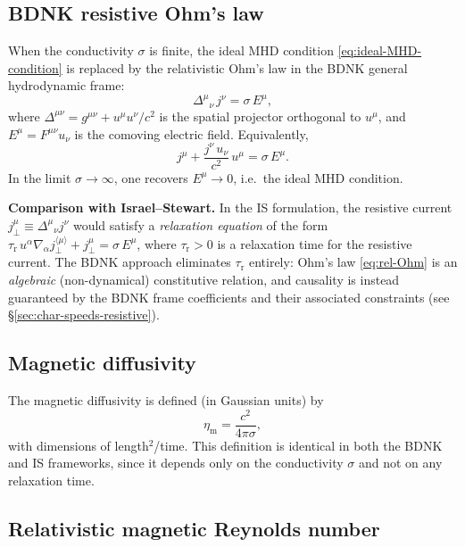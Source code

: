 \subsection{BDNK resistive Ohm's law}

When the conductivity $\sigma$ is finite, the ideal MHD condition
\eqref{eq:ideal-MHD-condition} is replaced by the relativistic Ohm's law
in the BDNK general hydrodynamic frame:
\begin{equation}
  \Delta^{\mu}{}_{\nu}\,j^{\nu} = \sigma\,E^{\mu},
  \label{eq:rel-Ohm-proj}
\end{equation}
where $\Delta^{\mu\nu} = g^{\mu\nu}+u^{\mu}u^{\nu}/c^{2}$ is the
spatial projector orthogonal to $u^{\mu}$, and $E^{\mu}=F^{\mu\nu}u_{\nu}$
is the comoving electric field.  Equivalently,
\begin{equation}
  j^{\mu} + \frac{j^{\nu}\,u_{\nu}}{c^{2}}\,u^{\mu}
  = \sigma\,E^{\mu}.
  \label{eq:rel-Ohm}
\end{equation}
In the limit $\sigma\to\infty$, one recovers $E^{\mu}\to 0$,
i.e.\ the ideal MHD condition.

\medskip\noindent
\textbf{Comparison with Israel--Stewart.}\quad
In the IS formulation, the resistive current $j^{\mu}_{\perp}
\equiv \Delta^{\mu}{}_{\nu}j^{\nu}$ would satisfy a \emph{relaxation
equation} of the form
$\tau_{\mathrm{r}}\,u^{\alpha}\nabla_{\alpha}j^{\langle\mu\rangle}_{\perp}
+ j^{\mu}_{\perp} = \sigma\,E^{\mu}$,
where $\tau_{\mathrm{r}}>0$ is a relaxation time for the resistive
current.  The BDNK approach eliminates $\tau_{\mathrm{r}}$ entirely:
Ohm's law \eqref{eq:rel-Ohm} is an \emph{algebraic} (non-dynamical)
constitutive relation, and causality is instead guaranteed by the
BDNK frame coefficients and their associated constraints (see
\S\ref{sec:char-speeds-resistive}).

\subsection{Magnetic diffusivity}

The magnetic diffusivity is defined (in Gaussian units) by
\begin{equation}
  \eta_{\mathrm{m}} = \frac{c^{2}}{4\pi\sigma},
  \label{eq:eta-m}
\end{equation}
with dimensions of length$^{2}$/time.  This definition is identical in
both the BDNK and IS frameworks, since it depends only on the
conductivity $\sigma$ and not on any relaxation time.

\subsection{Relativistic magnetic Reynolds number}

